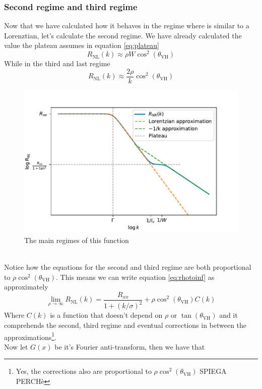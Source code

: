 \subsubsection*{Second regime and third regime}
Now that we have calculated how it behaves in the regime where is similar to a Lorenztian, let's calculate the second regime. We have already calculated the value the plateau assumes in equation \ref{eq:plateau} 
\begin{equation}
    R_{\textrm{NL}}(k)\approx \rho W\cos^2(\theta_{\textrm{VH}})
    \label{eq:second_regime}
\end{equation}
While in the third and last regime 
\begin{equation}
    R_{\textrm{NL}}(k)\approx \frac{2\rho}k \cos^2(\theta_{\textrm{VH}})
    \label{eq:third_regime}
\end{equation}
\begin{figure}[h!]
    \centering
    \includegraphics[width=\linewidth]{Immagini/rnl/rho3.pdf}
    \caption{The main regimes of this function}
    \label{fig:rho3}
\end{figure}\\
Notice how the equations for the second and third regime are both proportional to $\rho\cos^2(\theta_{\textrm{VH}})$. This means we can write equation \ref{eq:rhotoinf} as approximately
\begin{equation}
    \lim_{\rho\to\infty} R_{\textrm{NL}}(k)=\frac{R_{xx}}{1+(k/\sigma)^2} + \rho\cos^2(\theta_{\textrm{VH}}) C(k)
    \label{eq:rhotoinf2}
\end{equation}
Where $C(k)$ is a function that doesn't depend on $\rho$ or $\tan(\theta_{\textrm{VH}})$ and it comprehends the second, third regime and eventual corrections in between the approximations\footnote{Yes, the corrections also are proportional to $\rho\cos^2(\theta_{\textrm{VH}})$ SPIEGA PERCHè}.\\
Now let $G(x)$ be it's Fourier anti-transform, then we have that 

